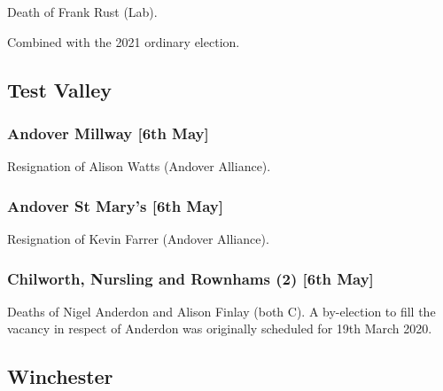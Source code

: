 \documentclass[a4paper,openany]{book}
\begin{document}
\begin{resultsiii}

Death of Frank Rust (Lab).

Combined with the 2021 ordinary election.

\subsection*{Test Valley}

\subsubsection*{Andover Millway \hspace*{\fill}\nolinebreak[1]%
	\enspace\hspace*{\fill}
	[6th May]}


Resignation of Alison Watts (Andover Alliance).

\subsubsection*{Andover St Mary's \hspace*{\fill}\nolinebreak[1]%
	\enspace\hspace*{\fill}
	[6th May]}


Resignation of Kevin Farrer (Andover Alliance).

\subsubsection*{Chilworth, Nursling and Rownhams (2) \hspace*{\fill}\nolinebreak[1]%
	\enspace\hspace*{\fill}
	[6th May]}


Deaths of Nigel Anderdon and Alison Finlay (both C).  A by-election to fill the vacancy in respect of Anderdon was originally scheduled for 19th March 2020.

\subsection*{Winchester}


\end{resultsiii}
\end{document}
